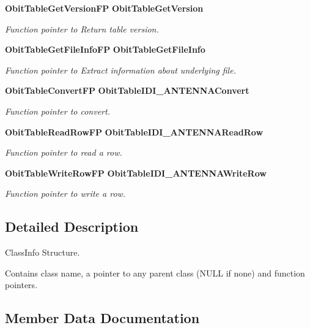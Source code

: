 \begin{CompactItemize}
{\bf Obit\-Table\-Get\-Version\-FP} {\bf Obit\-Table\-Get\-Version}
\begin{CompactList}\small\item\em Function pointer to Return table version. \item\end{CompactList}\item 
{\bf Obit\-Table\-Get\-File\-Info\-FP} {\bf Obit\-Table\-Get\-File\-Info}
\begin{CompactList}\small\item\em Function pointer to Extract information about underlying file. \item\end{CompactList}\item 
{\bf Obit\-Table\-Convert\-FP} {\bf Obit\-Table\-IDI\_\-ANTENNAConvert}
\begin{CompactList}\small\item\em Function pointer to convert. \item\end{CompactList}\item 
{\bf Obit\-Table\-Read\-Row\-FP} {\bf Obit\-Table\-IDI\_\-ANTENNARead\-Row}
\begin{CompactList}\small\item\em Function pointer to read a row. \item\end{CompactList}\item 
{\bf Obit\-Table\-Write\-Row\-FP} {\bf Obit\-Table\-IDI\_\-ANTENNAWrite\-Row}
\begin{CompactList}\small\item\em Function pointer to write a row. \item\end{CompactList}\end{CompactItemize}


\subsection{Detailed Description}
Class\-Info Structure. 

Contains class name, a pointer to any parent class (NULL if none) and function pointers. 



\subsection{Member Data Documentation}
